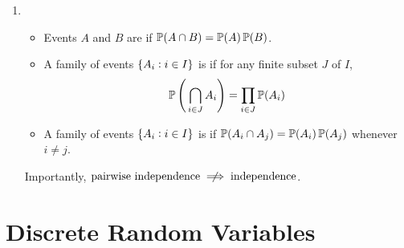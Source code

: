 \documentclass{styles/note}
\begin{document}
\begin{enumerate}[label=(\alph*)]
    \item
      \begin{itemize}[leftmargin=1em]
        \item Events $A$ and $B$ are  if $\operatorname{\mathbb{P}}(A \cap B) = \operatorname{\mathbb{P}}(A)\operatorname{\mathbb{P}}(B)$.
        \item A family of events $\set{A_i : i \in I}$ is  if for any finite subset $J$ of $I$,
          \begin{equation}
            \operatorname{\mathbb{P}}\Bigg( \bigcap_{i \in J} A_i \Bigg) = \prod_{i \in J} \operatorname{\mathbb{P}}(A_i)
          \end{equation}
        \item A family of events $\set{A_i : i \in I}$ is  if $\operatorname{\mathbb{P}}(A_i \cap A_j) = \operatorname{\mathbb{P}}(A_i) \operatorname{\mathbb{P}}(A_j)$ whenever $i \neq j$.
      \end{itemize}
      Importantly, $\textrm{pairwise independence} \centernot\implies \textrm{independence}$.
  \end{enumerate}


\newpage
\section{Discrete Random Variables}
  
\end{document}
